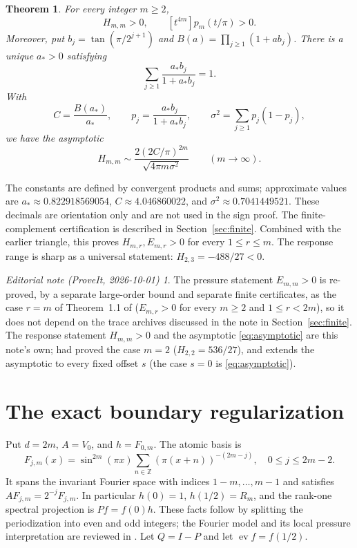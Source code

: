 \documentclass[11pt,a4paper]{article}
\newtheorem{theorem}{Theorem}[section]\newtheorem{lemma}[theorem]{Lemma}
\theoremstyle{remark}\newtheorem*{ednote}{Editorial note (ProveIt, 2026-10-01)}
\newcommand{\Z}{\mathbb Z}\newcommand{\ii}{\mathrm i}\newcommand{\ev}{\operatorname{ev}}
\begin{document}
\begin{theorem}\label{thm:main}
For every integer $m\ge2$,
\[
 H_{m,m}>0,\qquad [t^{4m}]p_m(t/\pi)>0.
\]
Moreover, put $b_j=\tan(\pi/2^{j+1})$ and $B(a)=\prod_{j\ge1}(1+ab_j)$. There is a unique $a_*>0$ satisfying
\[
 \sum_{j\ge1}\frac{a_*b_j}{1+a_*b_j}=1.
\]
With
\[
 C=\frac{B(a_*)}{a_*},\qquad p_j=\frac{a_*b_j}{1+a_*b_j},\qquad
 \sigma^2=\sum_{j\ge1}p_j(1-p_j),
\]
we have the asymptotic
\begin{equation}\label{eq:asymptotic}
 H_{m,m}\sim\frac{2(2C/\pi)^{2m}}{\sqrt{4\pi m\sigma^2}}
 \qquad(m\to\infty).
\end{equation}
\end{theorem}
The constants are defined by convergent products and sums; approximate values are $a_*\approx0.822918569054$, $C\approx4.046860022$, and $\sigma^2\approx0.7041449521$. These decimals are orientation only and are not used in the sign proof. The finite-complement certification is described in Section~\ref{sec:finite}. Combined with the earlier triangle, this proves $H_{m,r},E_{m,r}>0$ for every $1\le r\le m$. The response range is sharp as a universal statement: $H_{2,3}=-488/27<0$.
\begin{ednote}
The pressure statement $E_{m,m}>0$ is re-proved, by a separate large-order bound and separate
finite certificates, as the case $r=m$ of Theorem~1.1 of 
($E_{m,r}>0$ for every $m\ge2$ and $1\le r<2m$), so it does not depend on the trace archives
discussed in the note in Section~\ref{sec:finite}. The response statement $H_{m,m}>0$ and the
asymptotic \eqref{eq:asymptotic} are this note's own;  had
proved the case $m=2$ ($H_{2,2}=536/27$), and  extends the
asymptotic to every fixed offset $s$ (the case $s=0$ is \eqref{eq:asymptotic}).
\end{ednote}

\section{The exact boundary regularization}
Put $d=2m$, $A=V_0$, and $h=F_{0,m}$. The atomic basis is
\[
 F_{j,m}(x)=\sin^{2m}(\pi x)\sum_{n\in\Z}(\pi(x+n))^{-(2m-j)},
 \quad0\le j\le2m-2.
\]
It spans the invariant Fourier space with indices $1-m,\ldots,m-1$ and satisfies $AF_{j,m}=2^{-j}F_{j,m}$. In particular $h(0)=1$, $h(1/2)=R_m$, and the rank-one spectral projection is $Pf=f(0)h$. These facts follow by splitting the periodization into even and odd integers; the Fourier model and its local pressure interpretation are reviewed in \cite{integer,triangle}. Let $Q=I-P$ and let $\ev f=f(1/2)$.
\end{document}
